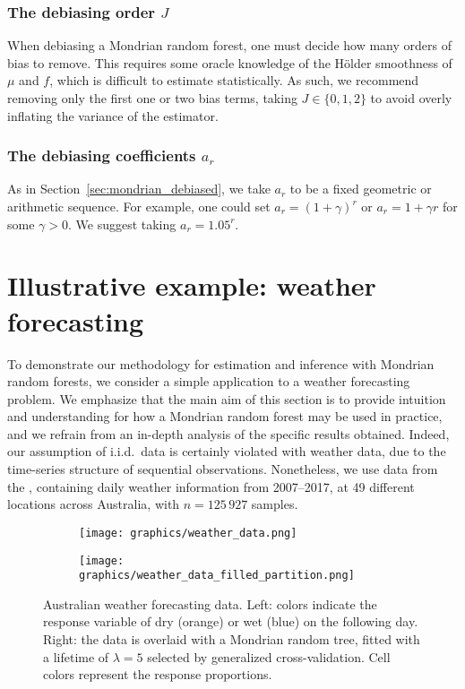 \documentclass[11pt,lof]{puthesis}
\theoremstyle{break}
\theoremstyle{proof}
\begin{document}
\subsubsection*{The debiasing order \texorpdfstring{$J$}{J}}%

When debiasing a Mondrian random forest, one must decide
how many orders of bias to remove. This requires some
oracle knowledge of the H{\"o}lder smoothness of $\mu$ and $f$, which is
difficult to estimate statistically. As such, we recommend
removing only the first one or two bias terms, taking $J \in \{0,1,2\}$ to
avoid overly inflating the variance of the estimator.

\subsubsection*{The debiasing coefficients \texorpdfstring{$a_r$}{ar}}%

As in Section~\ref{sec:mondrian_debiased}, we take $a_r$ to be a fixed
geometric or arithmetic sequence. For example, one could set
$a_r = (1+\gamma)^r$ or $a_r = 1 + \gamma r$ for some $\gamma > 0$.
We suggest taking $a_r = 1.05^r$.

\section{Illustrative example: weather forecasting}%
\label{sec:mondrian_weather}

To demonstrate our methodology for estimation and inference with Mondrian random
forests, we consider a simple application
to a weather forecasting problem. We emphasize that the main aim of this
section is to provide intuition and understanding for how a Mondrian random
forest may be used in practice, and we refrain from an in-depth analysis of the
specific results obtained. Indeed, our assumption of i.i.d.\ data is
certainly violated with weather data, due to the time-series
structure of sequential observations.
Nonetheless, we use data from the \citet{bureau2017daily}, containing daily
weather information from 2007--2017, at 49 different
locations across Australia, with $n = 125\,927$ samples.

\begin{figure}[b!]
  \centering
  \begin{subfigure}{0.49\textwidth}
    \centering
    \texttt{[image: graphics/weather\_data.png]}%
  \end{subfigure}
  \begin{subfigure}{0.49\textwidth}
    \centering
    \texttt{[image: graphics/weather\_data\_filled\_partition.png]}%
  \end{subfigure}
  \caption[Australian weather forecasting data]{
    Australian weather forecasting data. Left: colors indicate the response
    variable of dry (orange) or wet (blue) on the following
    day. Right: the data is overlaid with a Mondrian random tree,
    fitted with a lifetime of $\lambda = 5$
    selected by generalized cross-validation. Cell colors represent the response
  proportions.}
  \label{fig:mondrian_weather_data}
\end{figure}
\end{document}
